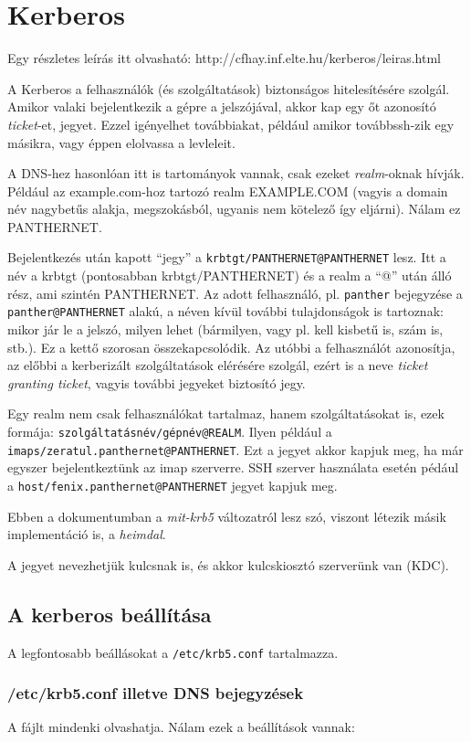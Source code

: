 \chapter{Kerberos}

Egy részletes leírás itt olvasható: http://cfhay.inf.elte.hu/kerberos/leiras.html

A Kerberos a felhasználók (és szolgáltatások) biztonságos hitelesítésére szolgál. Amikor valaki bejelentkezik a gépre
a jelszójával, akkor kap egy őt azonosító \emph{ticket}-et, jegyet. Ezzel igényelhet továbbiakat, például amikor
továbbssh-zik egy másikra, vagy éppen elolvassa a levleleit.

A DNS-hez hasonlóan itt is tartományok vannak, csak ezeket \emph{realm}-oknak hívják. Például az example.com-hoz
tartozó realm EXAMPLE.COM (vagyis a domain név nagybetűs alakja, megszokásból, ugyanis nem kötelező így
eljárni). Nálam ez PANTHERNET.

Bejelentkezés után kapott ``jegy'' a \texttt{krbtgt/PANTHERNET@PANTHERNET} lesz. Itt a név a krbtgt (pontosabban
krbtgt/PANTHERNET) és a realm a ``@'' után álló rész, ami szintén PANTHERNET. Az adott felhasználó,
pl. \texttt{panther} bejegyzése a \texttt{panther@PANTHERNET} alakú, a néven kívül további tulajdonságok is tartoznak:
mikor jár le a jelszó, milyen lehet (bármilyen, vagy pl. kell kisbetű is, szám is, stb.). Ez a kettő szorosan
összekapcsolódik. Az utóbbi a felhasználót azonosítja, az előbbi a kerberizált szolgáltatások elérésére szolgál, ezért
is a neve \emph{ticket granting ticket}, vagyis további jegyeket biztosító jegy.

Egy realm nem csak felhasználókat tartalmaz, hanem szolgáltatásokat is, ezek formája:
\texttt{szolgáltatásnév/gépnév@REALM}. Ilyen például a \texttt{imaps/zeratul.panthernet@PANTHERNET}. Ezt a jegyet
akkor kapjuk meg, ha már egyszer bejelentkeztünk az imap szerverre. SSH szerver használata esetén pédául a
\texttt{host/fenix.panthernet@PANTHERNET} jegyet kapjuk meg.

Ebben a dokumentumban a \emph{mit-krb5} változatról lesz szó, viszont létezik másik implementáció is, a \emph{heimdal}.

A jegyet nevezhetjük kulcsnak is, és akkor kulcskiosztó szerverünk van (KDC).
\section{A kerberos beállítása}
A legfontosabb beállásokat a \texttt{/etc/krb5.conf} tartalmazza.

\subsection{/etc/krb5.conf illetve DNS bejegyzések}
A fájlt mindenki olvashatja. Nálam ezek a beállítások vannak:

